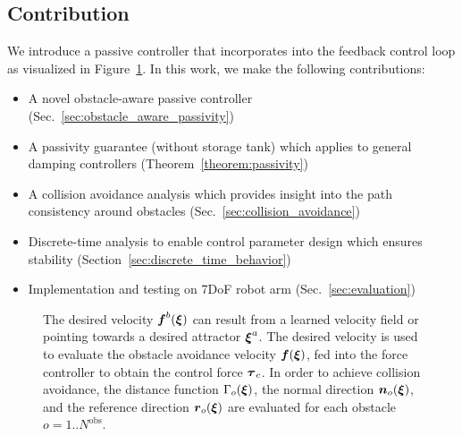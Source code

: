 \subsection{Contribution}
We introduce a passive controller that incorporates into the feedback control loop as visualized in Figure~\ref{fig:control_scheme_passive}. 
In this work, we make the following contributions:
\begin{itemize}
\item A novel obstacle-aware passive controller
(Sec.~\ref{sec:obstacle_aware_passivity})
\item A passivity guarantee (without storage tank) which applies to general damping controllers (Theorem~\ref{theorem:passivity})
\ifthesis
{}
\else
\item A collision avoidance analysis which provides insight into the path consistency around obstacles (Sec.~\ref{sec:collision_avoidance})
\fi
\iflong
\item Discrete-time analysis to enable control parameter design which ensures stability (Section~\ref{sec:discrete_time_behavior})
\fi
\item Implementation and testing on 7DoF robot arm (Sec.~\ref{sec:evaluation})
\end{itemize}

\begin{figure}[thb]
  \center
  
\caption{The desired velocity $\boldsymbol{f}^b(\boldsymbol{\xi})$ can result from a learned velocity field or pointing towards a desired attractor $\boldsymbol{\xi}^a$. The desired velocity is used to evaluate the obstacle avoidance velocity $\boldsymbol{f}(\boldsymbol{\xi})$, fed into the force controller to obtain the control force $\boldsymbol{\tau}_c$. In order to achieve collision avoidance, the distance function $\Gamma_o(\boldsymbol{\xi})$, the normal direction $\boldsymbol{n}_o(\boldsymbol{\xi})$, and the reference direction $\boldsymbol{r}_o(\boldsymbol{\xi})$ are evaluated for each obstacle $o = 1 .. N^\mathrm{{obs}}$.}
\label{fig:control_scheme_passive}
\end{figure}
